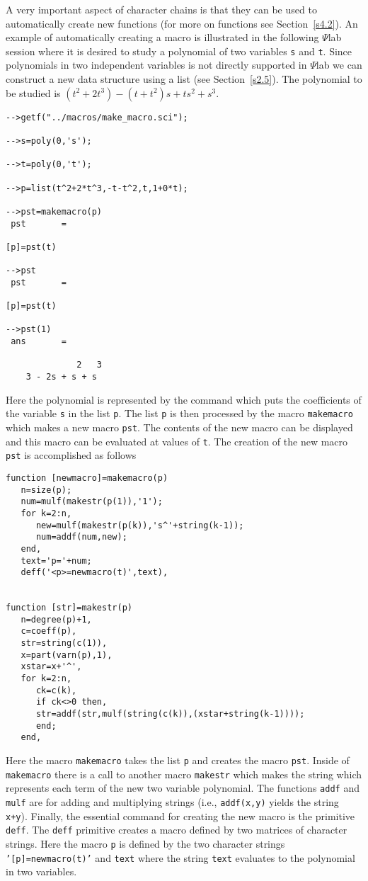 	A very important aspect of character chains is that they
can be used to automatically create new functions (for more on functions
see Section~\ref{s4.2}).  An example of automatically creating a 
macro is illustrated in the following $\Psi$lab session where it is
desired to study a polynomial of two variables {\tt s} and {\tt t}.
Since polynomials in two independent variables is not directly 
supported in $\Psi$lab we can construct a new data structure using
a list (see Section~\ref{s2.5}).
The polynomial to be studied is $(t^2+2t^3)-(t+t^2)s+ts^2+s^3$.
\begin{verbatim}
-->getf("../macros/make_macro.sci");
 
-->s=poly(0,'s');
 
-->t=poly(0,'t');
 
-->p=list(t^2+2*t^3,-t-t^2,t,1+0*t);
 
-->pst=makemacro(p)
 pst       =
 
[p]=pst(t)
 
-->pst
 pst       =
 
[p]=pst(t)
 
-->pst(1)
 ans       =
 
              2   3  
    3 - 2s + s + s   
\end{verbatim}
Here the polynomial is represented by the command which puts
the coefficients of the variable {\tt s} in the list {\tt p}.
The list {\tt p} is then processed by the macro {\tt makemacro}
which makes a new macro {\tt pst}.  The contents of the new macro
can be displayed and this macro can be evaluated
at values of {\tt t}.  The creation of the new macro {\tt pst}
is accomplished as follows
\begin{verbatim}
function [newmacro]=makemacro(p)
   n=size(p);
   num=mulf(makestr(p(1)),'1');
   for k=2:n,
      new=mulf(makestr(p(k)),'s^'+string(k-1));
      num=addf(num,new);
   end,
   text='p='+num;
   deff('<p>=newmacro(t)',text),


function [str]=makestr(p)
   n=degree(p)+1,
   c=coeff(p),
   str=string(c(1)),
   x=part(varn(p),1),
   xstar=x+'^',
   for k=2:n, 
      ck=c(k), 
      if ck<>0 then,
      str=addf(str,mulf(string(c(k)),(xstar+string(k-1))));
      end;
   end,

\end{verbatim}
Here the macro {\tt makemacro} takes the list {\tt p} and creates the
macro {\tt pst}.  Inside of {\tt makemacro} there is a call to another 
macro {\tt makestr} which makes the string which represents each 
term of the new two variable polynomial.  The functions {\tt addf} and
{\tt mulf} are for adding and multiplying strings (i.e., 
{\tt addf(x,y)} yields the string {\tt x+y}).  Finally, the 
essential command for creating the new macro 
is the primitive {\tt deff}.  The {\tt deff} primitive 
creates a macro defined by two matrices
of character strings.  Here the 
macro {\tt p} is defined by the two character strings
{\tt '[p]=newmacro(t)'} and {\tt text} where the string {\tt text}
evaluates to the polynomial in two variables.

